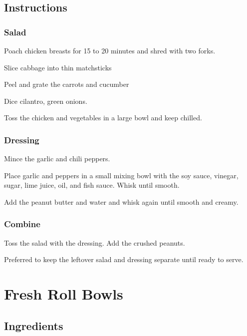 \documentclass[ansiapaper,10pt,english]{sphinxmanual}
\begin{document}
\section{Instructions}
\label{\detokenize{Chopped_Thai_Cluck_Salad:instructions}}

\subsection{Salad}
\label{\detokenize{Chopped_Thai_Cluck_Salad:id1}}
Poach chicken breasts for 15 to 20 minutes and shred with two forks.

Slice cabbage into thin matchsticks

Peel and grate the carrots and cucumber

Dice cilantro, green onions.

Toss the chicken and vegetables in a large bowl and keep chilled.


\subsection{Dressing}
\label{\detokenize{Chopped_Thai_Cluck_Salad:id2}}
Mince the garlic and chili peppers.

Place garlic and peppers in a small mixing bowl with the soy sauce, vinegar, sugar, lime juice, oil, and fish sauce. Whisk until smooth.

Add the peanut butter and water and whisk again until smooth and creamy.


\subsection{Combine}
\label{\detokenize{Chopped_Thai_Cluck_Salad:combine}}
Toss the salad with the dressing. Add the crushed peanuts.

Preferred to keep the leftover salad and dressing separate until ready to serve.


\chapter{Fresh Roll Bowls}
\label{\detokenize{FRB:fresh-roll-bowls}}\label{\detokenize{FRB::doc}}

\section{Ingredients}
\label{\detokenize{FRB:ingredients}}
\end{document}
